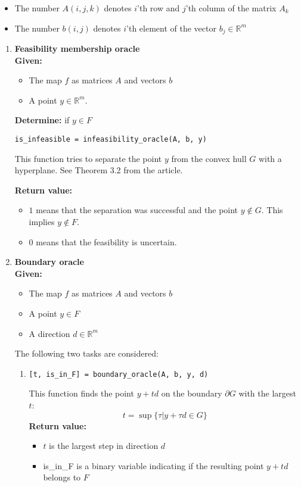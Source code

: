 \documentclass[a4paper]{article}
\newcommand{\R}{\mathbb{R}}
\theoremstyle{definition}
\begin{document}
\begin{itemize}
\item The number $A(i, j, k)$ denotes $i$'th row and $j$'th column of the matrix $A_k$
\item The number $b(i, j)$ denotes $i$'th element of the vector $b_j\in\mathbb{R}^m$
\end{itemize}

\begin{enumerate}
\item {\bf Feasibility membership oracle}\\
{\bf Given:}
\begin{itemize}
\item The map $f$ as matrices $A$ and vectors $b$
\item A point $y\in\mathbb{R}^m$.
\end{itemize}
{\bf Determine:} if $y\in F$
\begin{verbatim}
is_infeasible = infeasibility_oracle(A, b, y)
\end{verbatim}
This function tries to separate the point $y$ from the convex hull $G$ with a hyperplane. See Theorem 3.2 from the article.

{\bf Return value:}
\begin{itemize}
\item $1$ means that the separation was successful and the point $y\notin G$. This implies $y\notin F$.
\item $0$ means that the feasibility is uncertain.
\end{itemize}

\item {\bf Boundary oracle}\\
{\bf Given:}
\begin{itemize}
	\item The map $f$ as matrices $A$ and vectors $b$
	\item A point $y\in F$
	\item A direction $d\in\R^m$
\end{itemize}
The following two tasks are considered:
\begin{enumerate}
\item \begin{verbatim}
[t, is_in_F] = boundary_oracle(A, b, y, d)
\end{verbatim}
This function finds the point $y+td$ on the boundary $\partial G$ with the largest $t$:
$$t = \sup\{\tau\big| y+\tau d\in G\}$$
{\bf Return value:}
\begin{itemize}
	\item $t$ is the largest step in direction $d$
	\item is\_in\_F is a binary variable indicating if the resulting point $y+td$ belongs to $F$
\end{itemize}


\end{enumerate}
\end{enumerate}
\end{document}
